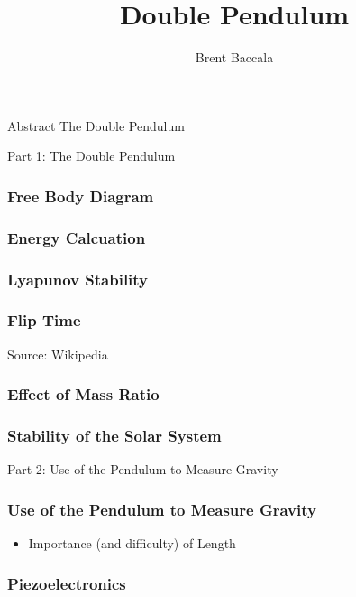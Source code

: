 \documentclass{beamer}
\title{Double Pendulum}
\author{Brent Baccala}
\institute{\tt cosine@freesoft.org}
\begin{document}
\begin{frame}
\titlepage
\begin{block}{Abstract}
The Double Pendulum
\end{block}
\end{frame}

\begin{frame}
\begin{exampleblock}{}
\begin{center}
\vskip 20pt
\Huge
Part 1: The Double Pendulum
\vskip 6pt
\ 
\end{center}
\end{exampleblock}
\end{frame}

\begin{frame}
\frametitle{Free Body Diagram}
\end{frame}

\begin{frame}
\frametitle{Energy Calcuation}
\end{frame}

\begin{frame}
\frametitle{Lyapunov Stability}
\end{frame}

\begin{frame}
\frametitle{Flip Time}
{\tiny Source: Wikipedia}

\end{frame}

\begin{frame}
\frametitle{Effect of Mass Ratio}
\end{frame}

\begin{frame}
\frametitle{Stability of the Solar System}
\end{frame}


\begin{frame}
\begin{exampleblock}{}
\begin{center}
\vskip 20pt
\Huge
Part 2: Use of the Pendulum to Measure Gravity
\vskip 6pt
\ 
\end{center}
\end{exampleblock}
\end{frame}

\begin{frame}
\frametitle{Use of the Pendulum to Measure Gravity}
\begin{itemize}
\item Importance (and difficulty) of Length
\end{itemize}
\end{frame}

\begin{frame}
\frametitle{Piezoelectronics}
\end{frame}
\end{document}
